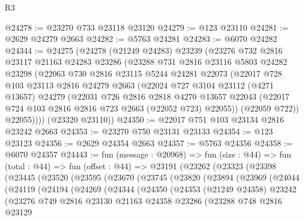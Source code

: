 \begin{lexlean}{R3}
\begin{coremodule}
@24278 := @23270 @733 @23118 @23120
@24279 := @123 @23110
@24281 := @2629 @24279 @2663
@24282 := @5763 @24281
@24283 := @6070 @24282
@24344 := @24275
    (@24278
      (@21249 @24283)
      @23239
      (@23276
        @732
        @2816
        @23117
        @21163
        @24283
        @23286
        (@23288
          @731
          @2816
          @23116
          @5803
          @24282
          @23298
          (@22063
            @730
            @2816
            @23115
            @5244
            @24281
            @22073
            (@22017
              @728
              @103
              @23113
              @2816
              @24279
              @2663
              (@22024
                @727
                @3104
                @23112
                (@4271 @13657)
                @24279
                (@22031
                  @726
                  @2816
                  @2818
                  @4270
                  @13657
                  @22043
                  (@22017 @724 @103 @2816 @2816 @723 @2663 (@22052 @723) @22055))
                (@22059 @722))
              @22055))))
      (@23320 @23110))
@24350 := @22017 @751 @103 @23134 @2816 @23242 @2663
@24353 := @23270 @750 @23131 @23133
@24354 := @123 @23123
@24356 := @2629 @24354 @2663
@24357 := @5763 @24356
@24358 := @6070 @24357
@24443 := fun (message : @20968) =>
  fun (size : @44) =>
  fun (total : @44) =>
  fun (offset : @44) =>
  @23191
    (@23262
      (@23323
        (@23398
          (@23445
            (@23520
              (@23595
                (@23670
                  (@23745
                    (@23820
                      (@23894
                        (@23969
                          (@24044
                            (@24119
                              (@24194
                                (@24269
                                  (@24344
                                    (@24350
                                      (@24353
                                        (@21249 @24358)
                                        @23242
                                        (@23276
                                          @749
                                          @2816
                                          @23130
                                          @21163
                                          @24358
                                          @23286
                                          (@23288
                                            @748
                                            @2816
                                            @23129

\end{coremodule}
\end{lexlean}
